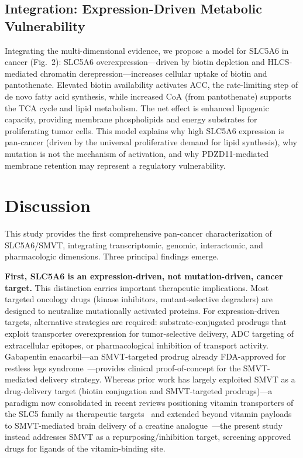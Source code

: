 \documentclass[10pt,letterpaper]{article}
\begin{document}
\subsection*{Integration: Expression-Driven Metabolic Vulnerability}

Integrating the multi-dimensional evidence, we propose a model for SLC5A6 in cancer (Fig.~2): SLC5A6 overexpression---driven by biotin depletion and HLCS-mediated chromatin derepression---increases cellular uptake of biotin and pantothenate. Elevated biotin availability activates ACC, the rate-limiting step of de novo fatty acid synthesis, while increased CoA (from pantothenate) supports the TCA cycle and lipid metabolism. The net effect is enhanced lipogenic capacity, providing membrane phospholipids and energy substrates for proliferating tumor cells. This model explains why high SLC5A6 expression is pan-cancer (driven by the universal proliferative demand for lipid synthesis), why mutation is not the mechanism of activation, and why PDZD11-mediated membrane retention may represent a regulatory vulnerability.


\section*{Discussion}

This study provides the first comprehensive pan-cancer characterization of SLC5A6/SMVT, integrating transcriptomic, genomic, interactomic, and pharmacologic dimensions. Three principal findings emerge.

\noindent\textbf{First, SLC5A6 is an expression-driven, not mutation-driven, cancer target.} This distinction carries important therapeutic implications. Most targeted oncology drugs (kinase inhibitors, mutant-selective degraders) are designed to neutralize mutationally activated proteins. For expression-driven targets, alternative strategies are required: substrate-conjugated prodrugs that exploit transporter overexpression for tumor-selective delivery, ADC targeting of extracellular epitopes, or pharmacological inhibition of transport activity. Gabapentin enacarbil---an SMVT-targeted prodrug already FDA-approved for restless legs syndrome~\cite{cundy2004}---provides clinical proof-of-concept for the SMVT-mediated delivery strategy. Whereas prior work has largely exploited SMVT as a drug-delivery target (biotin conjugation and SMVT-targeted prodrugs)---a paradigm now consolidated in recent reviews positioning vitamin transporters of the SLC5 family as therapeutic targets~\cite{yuan2025} and extended beyond vitamin payloads to SMVT-mediated brain delivery of a creatine analogue~\cite{kralova2026}---the present study instead addresses SMVT as a repurposing/inhibition target, screening approved drugs for ligands of the vitamin-binding site.
\end{document}
